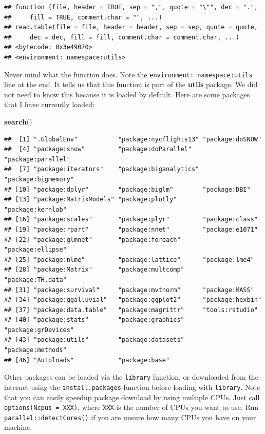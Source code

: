 \documentclass[]{book}
\newenvironment{Shaded}{\begin{snugshade}}{\end{snugshade}}
\newcommand{\KeywordTok}[1]{\textcolor[rgb]{0.13,0.29,0.53}{\textbf{#1}}}
\newcommand{\NormalTok}[1]{#1}
\theoremstyle{definition}
\theoremstyle{definition}
\theoremstyle{definition}
\theoremstyle{remark}
\begin{document}
\begin{verbatim}
## function (file, header = TRUE, sep = ",", quote = "\"", dec = ".", 
##     fill = TRUE, comment.char = "", ...) 
## read.table(file = file, header = header, sep = sep, quote = quote, 
##     dec = dec, fill = fill, comment.char = comment.char, ...)
## <bytecode: 0x3e49070>
## <environment: namespace:utils>
\end{verbatim}

Never mind what the function does.
Note the \texttt{environment:\ namespace:utils} line at the end.
It tells us that this function is part of the \textbf{utils} package.
We did not need to know this because it is loaded by default.
Here are some packages that I have currently loaded:

\begin{Shaded}
\begin{Highlighting}[]
\KeywordTok{search}\NormalTok{()}
\end{Highlighting}
\end{Shaded}

\begin{verbatim}
##  [1] ".GlobalEnv"           "package:nycflights13" "package:doSNOW"      
##  [4] "package:snow"         "package:doParallel"   "package:parallel"    
##  [7] "package:iterators"    "package:biganalytics" "package:bigmemory"   
## [10] "package:dplyr"        "package:biglm"        "package:DBI"         
## [13] "package:MatrixModels" "package:plotly"       "package:kernlab"     
## [16] "package:scales"       "package:plyr"         "package:class"       
## [19] "package:rpart"        "package:nnet"         "package:e1071"       
## [22] "package:glmnet"       "package:foreach"      "package:ellipse"     
## [25] "package:nlme"         "package:lattice"      "package:lme4"        
## [28] "package:Matrix"       "package:multcomp"     "package:TH.data"     
## [31] "package:survival"     "package:mvtnorm"      "package:MASS"        
## [34] "package:ggalluvial"   "package:ggplot2"      "package:hexbin"      
## [37] "package:data.table"   "package:magrittr"     "tools:rstudio"       
## [40] "package:stats"        "package:graphics"     "package:grDevices"   
## [43] "package:utils"        "package:datasets"     "package:methods"     
## [46] "Autoloads"            "package:base"
\end{verbatim}

Other packages can be loaded via the \texttt{library} function, or downloaded from the internet using the \texttt{install.packages} function before loading with \texttt{library}.
Note that you can easily speedup package download by using multiple CPUs.
Just call \texttt{options(Ncpus\ =\ XXX)}, where \texttt{XXX} is the number of CPUs you want to use.
Run \texttt{parallel::detectCores()} if you are unsure how many CPUs you have on your machine.
\end{document}
